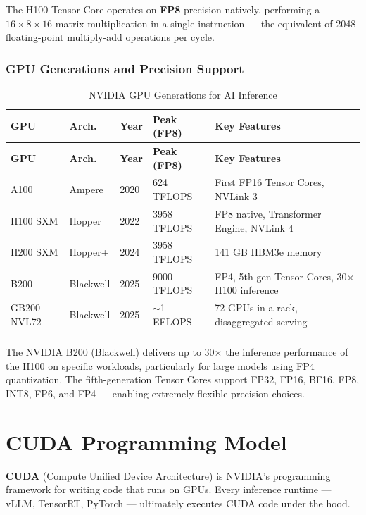 \documentclass[10pt, oneside, openany]{book}
\newcommand{\notebox}[2]{\begin{tcolorbox}[notestyle, title={#1}]#2\end{tcolorbox}}
\newcommand{\keyterm}[1]{\textbf{\color{AccentOrange}#1}}
\begin{document}
The H100 Tensor Core operates on \textbf{FP8} precision natively, performing a
$16 \times 8 \times 16$ matrix multiplication in a single instruction --- the
equivalent of 2048 floating-point multiply-add operations per cycle.

\subsubsection{GPU Generations and Precision Support}

\begin{longtable}{@{}p{2cm}p{2cm}p{1.5cm}p{1.5cm}p{5cm}@{}}
  \toprule
  \textbf{GPU} & \textbf{Arch.} & \textbf{Year} &
  \textbf{Peak (FP8)} & \textbf{Key Features} \\
  \midrule
  \endfirsthead
  \toprule
  \textbf{GPU} & \textbf{Arch.} & \textbf{Year} &
  \textbf{Peak (FP8)} & \textbf{Key Features} \\
  \midrule
  \endhead
  A100 & Ampere & 2020 & 624 TFLOPS & First FP16 Tensor Cores, NVLink 3 \\
  H100 SXM & Hopper & 2022 & 3958 TFLOPS & FP8 native, Transformer Engine, NVLink 4 \\
  H200 SXM & Hopper+ & 2024 & 3958 TFLOPS & 141 GB HBM3e memory \\
  B200 & Blackwell & 2025 & 9000 TFLOPS & FP4, 5th-gen Tensor Cores, 30$\times$ H100 inference \\
  GB200 NVL72 & Blackwell & 2025 & $\sim$1 EFLOPS & 72 GPUs in a rack, disaggregated serving \\
  \bottomrule
  \caption{NVIDIA GPU Generations for AI Inference}
  \label{tab:gpus}
\end{longtable}

\notebox{Blackwell's Leap}{
The NVIDIA B200 (Blackwell) delivers up to 30$\times$ the inference performance
of the H100 on specific workloads, particularly for large models using FP4
quantization.  The fifth-generation Tensor Cores support FP32, FP16, BF16, FP8,
INT8, FP6, and FP4 --- enabling extremely flexible precision choices.
}

\section{CUDA Programming Model}

\keyterm{CUDA} (Compute Unified Device Architecture) is NVIDIA's programming
framework for writing code that runs on GPUs.  Every inference runtime ---
vLLM, TensorRT, PyTorch --- ultimately executes CUDA code under the hood.
\end{document}
